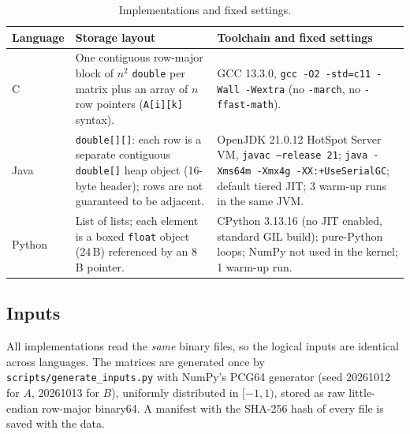 \documentclass[10pt,a4paper]{article}
\begin{document}
\begin{table}[H]
\centering\small
\caption{Implementations and fixed settings.}\label{tab:impl}
\begin{tabular}{p{1.4cm}p{5.6cm}p{8.0cm}}
\toprule
Language & Storage layout & Toolchain and fixed settings \\
\midrule
C & One contiguous row-major block of $n^2$ \texttt{double} per matrix plus an array of $n$ row
pointers (\texttt{A[i][k]} syntax). & GCC 13.3.0, \texttt{gcc -O2 -std=c11 -Wall -Wextra}
(no \texttt{-march}, no \texttt{-ffast-math}). \\
Java & \texttt{double[][]}: each row is a separate contiguous \texttt{double[]} heap object
(16-byte header); rows are not guaranteed to be adjacent. & OpenJDK 21.0.12 HotSpot Server VM,
\texttt{javac --release 21}; \texttt{java -Xms64m -Xmx4g -XX:+UseSerialGC}; default tiered JIT;
3 warm-up runs in the same JVM. \\
Python & List of lists; each element is a boxed \texttt{float} object (24\,B) referenced by an
8\,B pointer. & CPython 3.13.16 (no JIT enabled, standard GIL build); pure-Python loops; NumPy
not used in the kernel; 1 warm-up run. \\
\bottomrule
\end{tabular}
\end{table}

\subsection{Inputs}
All implementations read the \emph{same} binary files, so the logical inputs are identical
across languages. The matrices are generated once by \texttt{scripts/generate\_inputs.py}
with NumPy's PCG64 generator \cite{oneill2014} (seed 20261012 for $A$, 20261013 for $B$),
uniformly distributed in $[-1,1)$, stored as raw little-endian row-major binary64. A
manifest with the SHA-256 hash of every file is saved with the data.
\end{document}

